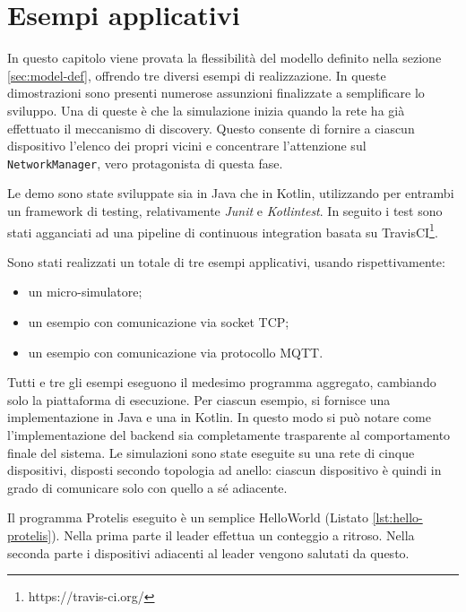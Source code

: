 \chapter{Esempi applicativi}
In questo capitolo viene provata la flessibilità del modello definito nella
sezione \ref{sec:model-def}, offrendo tre diversi esempi di realizzazione. In
queste dimostrazioni sono presenti numerose assunzioni finalizzate a
semplificare lo sviluppo. Una di queste è che la simulazione inizia quando la
rete ha già effettuato il meccanismo di discovery. Questo consente di fornire a
ciascun dispositivo l'elenco dei propri vicini e concentrare l'attenzione sul
\texttt{NetworkManager}, vero protagonista di questa fase.

Le demo sono state sviluppate sia in Java che in Kotlin,
utilizzando per entrambi un framework di testing, relativamente \textit{Junit} e
\textit{Kotlintest}. In seguito i test sono stati agganciati ad una pipeline di
continuous integration basata su TravisCI\footnote{https://travis-ci.org/}.

Sono stati realizzati un totale di tre esempi applicativi, usando
rispettivamente:
\begin{itemize}
\item un micro-simulatore;
\item un esempio con comunicazione via socket TCP;
\item un esempio con comunicazione via protocollo MQTT.
\end{itemize}

Tutti e tre gli esempi eseguono il medesimo programma aggregato, cambiando solo
la piattaforma di esecuzione. Per ciascun esempio, si fornisce una
implementazione in Java e una in Kotlin. In questo modo si può notare come
l'implementazione del backend sia completamente trasparente al comportamento
finale del sistema. Le simulazioni sono state eseguite su una rete di cinque
dispositivi, disposti secondo topologia ad anello: ciascun dispositivo è quindi
in grado di comunicare solo con quello a sé adiacente.

\begin{minipage}{\linewidth}

\end{minipage}

Il programma Protelis eseguito è un semplice HelloWorld (Listato
\ref{lst:hello-protelis}). Nella prima parte il leader effettua un conteggio a
ritroso. Nella seconda parte i dispositivi adiacenti al leader vengono salutati
da questo.

